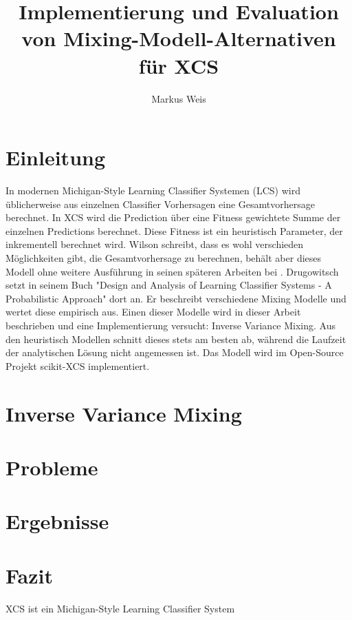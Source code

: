 \documentclass{ocsmnar}
\begin{document}
\title{Implementierung und Evaluation von Mixing-Modell-Alternativen für XCS}


\author{Markus Weis}

\maketitle




\section{Einleitung}
In modernen Michigan-Style Learning Classifier Systemen (LCS) wird üblicherweise aus einzelnen Classifier Vorhersagen eine Gesamtvorhersage berechnet. In XCS wird die Prediction über eine Fitness gewichtete Summe der einzelnen Predictions berechnet. Diese Fitness ist ein heuristisch Parameter, der inkrementell berechnet wird. Wilson schreibt, dass es wohl verschieden Möglichkeiten gibt, die Gesamtvorhersage zu berechnen, behält aber dieses Modell ohne weitere Ausführung in seinen späteren Arbeiten bei \cite{Wilson95}. 
Drugowitsch setzt in seinem Buch "Design and Analysis of Learning Classifier Systems - A Probabilistic Approach" \cite{book} dort an. Er beschreibt verschiedene Mixing Modelle und wertet diese empirisch aus. 
Einen dieser Modelle wird in dieser Arbeit beschrieben und eine Implementierung versucht: Inverse Variance Mixing. Aus den heuristisch Modellen schnitt dieses stets am besten ab, während die Laufzeit der  analytischen Lösung nicht angemessen ist. Das Modell wird im Open-Source Projekt scikit-XCS \cite{repo} implementiert. 

\section{Inverse Variance Mixing}

\section{Probleme}

\section{Ergebnisse}

\section{Fazit}





XCS ist ein Michigan-Style Learning Classifier System 











\end{document}
